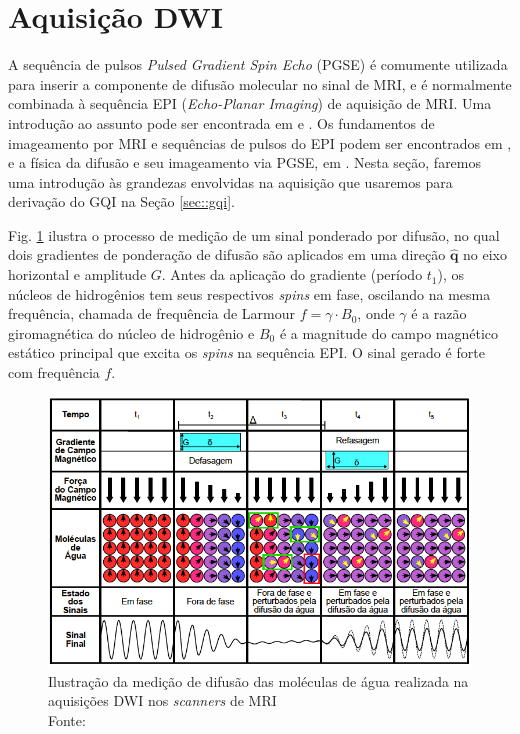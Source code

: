 \documentclass[
    12pt,                %
    oneside,            %
    a4paper,            %
    english,            %
    french,                %
    spanish,            %
    brazil                %
    ]{abntex2}
\begin{document}
\section{Aquisição DWI}
\label{sec::aquisicao_dwi}
A sequência de pulsos \textit{Pulsed Gradient Spin Echo}  (PGSE) é comumente utilizada para inserir a componente de difusão molecular no sinal de MRI, e é normalmente combinada à sequência  EPI (\textit{Echo-Planar Imaging}) de aquisição de MRI. Uma introdução ao assunto pode ser encontrada em  e . Os fundamentos de imageamento por MRI e sequências de pulsos do EPI podem ser encontrados em , e a física da difusão e seu imageamento via PGSE, em . Nesta seção, faremos uma introdução às grandezas envolvidas na aquisição que usaremos para derivação do GQI na Seção \ref{sec::gqi}.

Fig. \ref{fig::pgse_ilustrado} ilustra o processo de medição de um sinal ponderado por difusão, no qual dois gradientes de ponderação de difusão são aplicados em uma direção $\mathbf{\hat{q}}$ no eixo horizontal e amplitude $G$. Antes da aplicação do gradiente (período $t_1$), os núcleos de hidrogênios tem seus respectivos \textit{spins} em fase, oscilando na mesma frequência, chamada de frequência de Larmour $f = \gamma \cdot B_0$, onde $\gamma$ é a razão giromagnética do núcleo de hidrogênio e $B_0$ é a magnitude do campo magnético estático principal que excita os \textit{spins} na sequência EPI. O sinal gerado é forte com frequência $f$.

\begin{figure}[ht]

    \centering
    \includegraphics[width=.8\linewidth, angle=0]{figs/HARDI/pgse2.png}
    \caption{Ilustração da medição de difusão das moléculas de água realizada na aquisições DWI nos \textit{scanners} de MRI \\
    Fonte: \cite{voltoline2016}
    }
    \label{fig::pgse_ilustrado}
   \hspace{1pt}
\end{figure}
\end{document}
